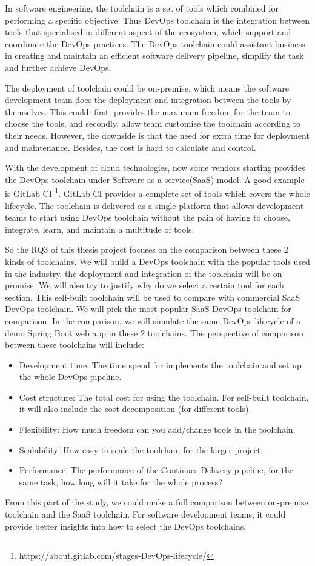 In software engineering, the toolchain is a set of tools which combined for performing a specific objective. Thus DevOps toolchain is the integration between tools that specialised in different aspect of the ecosystem, which support and coordinate the DevOps practices. The DevOps toolchain could assistant business in creating and maintain an efficient software delivery pipeline, simplify the task and further achieve DevOps.\cite{DevOpsto7:online}\cite{Toolchai10:online}
\par
The deployment of toolchain could be on-premise, which means the software development team does the deployment and integration between the tools by themselves. This could: first, provides the maximum freedom for the team to choose the tools, and secondly, allow team customise the toolchain according to their needs. However, the downside is that the need for extra time for deployment and maintenance. Besides, the cost is hard to calculate and control. 
\par
With the development of cloud technologies, now some vendors starting provides the DevOps toolchain under Software as a service(SaaS) model. A good example is GitLab CI \footnote{https://about.gitlab.com/stages-DevOps-lifecycle/}. GitLab CI provides a complete set of tools which covers the whole lifecycle. The toolchain is delivered as a single platform that allows development teams to start using DevOps toolchain without the pain of having to choose, integrate, learn, and maintain a multitude of tools. \cite{TheDevOp71:online}
\par
So the RQ3 of this thesis project focuses on the comparison between these 2 kinds of toolchains. We will build a DevOps toolchain with the popular tools used in the industry, the deployment and integration of the toolchain will be on-promise. We will also try to justify why do we select a certain tool for each section. This self-built toolchain will be used to compare with commercial SaaS DevOps toolchain. We will pick the most popular SaaS DevOps toolchain for comparison. In the comparison, we will simulate the same DevOps lifecycle of a demo Spring Boot web app in these 2 toolchains. The perspective of comparison between these toolchains will include:
\begin{itemize}
    \item Development time: The time spend for implements the toolchain and set up the whole DevOps pipeline.
    \item Cost structure: The total cost for using the toolchain. For self-built toolchain, it will also include the cost decomposition (for different tools).
    \item Flexibility: How much freedom can you add/change tools in the toolchain.
    \item Scalability: How easy to scale the toolchain for the larger project.
    \item Performance: The performance of the Continues Delivery pipeline, for the same task, how long will it take for the whole process?
\end{itemize}
From this part of the study, we could make a full comparison between on-premise toolchain and the SaaS toolchain. For software development teams, it could provide better insights into how to select the DevOps toolchains.
